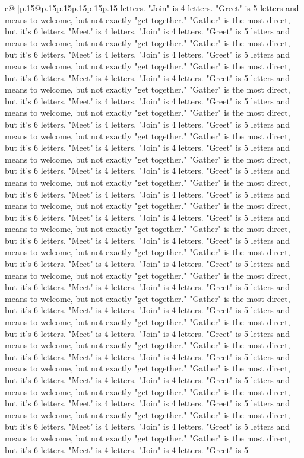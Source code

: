 \documentclass{article}
\begin{document}
{\begin{supertabular}{c@{$\;$}|p{.15\linewidth}@{}p{.15\linewidth}p{.15\linewidth}p{.15\linewidth}p{.15\linewidth}p{.15\linewidth}}
{{{letters. "Join" is 4 letters. "Greet" is 5 letters and means to welcome, but not exactly "get together." "Gather" is the most direct, but it's 6 letters. "Meet" is 4 letters. "Join" is 4 letters. "Greet" is 5 letters and means to welcome, but not exactly "get together." "Gather" is the most direct, but it's 6 letters. "Meet" is 4 letters. "Join" is 4 letters. "Greet" is 5 letters and means to welcome, but not exactly "get together." "Gather" is the most direct, but it's 6 letters. "Meet" is 4 letters. "Join" is 4 letters. "Greet" is 5 letters and means to welcome, but not exactly "get together." "Gather" is the most direct, but it's 6 letters. "Meet" is 4 letters. "Join" is 4 letters. "Greet" is 5 letters and means to welcome, but not exactly "get together." "Gather" is the most direct, but it's 6 letters. "Meet" is 4 letters. "Join" is 4 letters. "Greet" is 5 letters and means to welcome, but not exactly "get together." "Gather" is the most direct, but it's 6 letters. "Meet" is 4 letters. "Join" is 4 letters. "Greet" is 5 letters and means to welcome, but not exactly "get together." "Gather" is the most direct, but it's 6 letters. "Meet" is 4 letters. "Join" is 4 letters. "Greet" is 5 letters and means to welcome, but not exactly "get together." "Gather" is the most direct, but it's 6 letters. "Meet" is 4 letters. "Join" is 4 letters. "Greet" is 5 letters and means to welcome, but not exactly "get together." "Gather" is the most direct, but it's 6 letters. "Meet" is 4 letters. "Join" is 4 letters. "Greet" is 5 letters and means to welcome, but not exactly "get together." "Gather" is the most direct, but it's 6 letters. "Meet" is 4 letters. "Join" is 4 letters. "Greet" is 5 letters and means to welcome, but not exactly "get together." "Gather" is the most direct, but it's 6 letters. "Meet" is 4 letters. "Join" is 4 letters. "Greet" is 5 letters and means to welcome, but not exactly "get together." "Gather" is the most direct, but it's 6 letters. "Meet" is 4 letters. "Join" is 4 letters. "Greet" is 5 letters and means to welcome, but not exactly "get together." "Gather" is the most direct, but it's 6 letters. "Meet" is 4 letters. "Join" is 4 letters. "Greet" is 5 letters and means to welcome, but not exactly "get together." "Gather" is the most direct, but it's 6 letters. "Meet" is 4 letters. "Join" is 4 letters. "Greet" is 5 letters and means to welcome, but not exactly "get together." "Gather" is the most direct, but it's 6 letters. "Meet" is 4 letters. "Join" is 4 letters. "Greet" is 5 letters and means to welcome, but not exactly "get together." "Gather" is the most direct, but it's 6 letters. "Meet" is 4 letters. "Join" is 4 letters. "Greet" is 5 letters and means to welcome, but not exactly "get together." "Gather" is the most direct, but it's 6 letters. "Meet" is 4 letters. "Join" is 4 letters. "Greet" is 5 letters and means to welcome, but not exactly "get together." "Gather" is the most direct, but it's 6 letters. "Meet" is 4 letters. "Join" is 4 letters. "Greet" is 5 letters and means to welcome, but not exactly "get together." "Gather" is the most direct, but it's 6 letters. "Meet" is 4 letters. "Join" is 4 letters. "Greet" is 5 }}}
\end{supertabular}}
\end{document}

